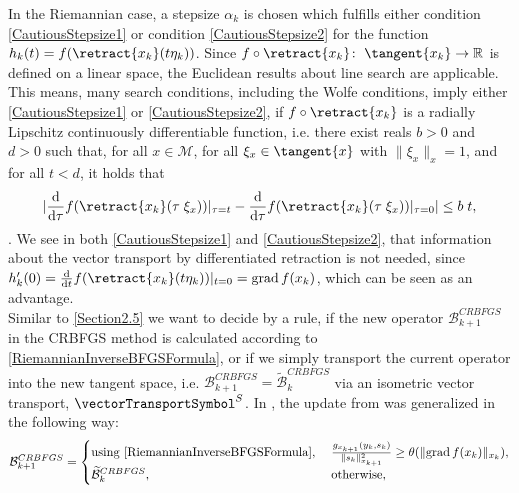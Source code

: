 In the Riemannian case, a stepsize $\alpha_k$ is chosen which fulfills either condition \cref{CautiousStepsize1} or condition \cref{CautiousStepsize2} for the function $h_k(t) = f(\retract{x_k}(t \eta_k))$. Since $f \circ \retract{x_k} \colon \; \tangent{x_k} \to \mathbb{R}$ is defined on a linear space, the Euclidean results about line search are applicable. This means, many search conditions, including the Wolfe conditions, imply either \cref{CautiousStepsize1} or \cref{CautiousStepsize2}, if $f \circ \retract{x_k}$ is a radially Lipschitz continuously differentiable function, i.e. there exist reals $b > 0$ and $d > 0$ such that, for all $x \in \mathcal{M}$, for all $\xi_x \in \tangent{x}$ with $\lVert \xi_x \rVert_x = 1$, and for all $t < d$, it holds that
\begin{equation}\label{RiemannianRadiallyLipschitzContinuouslyDifferentiable}
    \lvert \frac{\mathrm{d}}{\mathrm{d} \tau} f (\retract{x_k}(\tau \; \xi_x))\vert_{\tau = t} - \frac{\mathrm{d}}{\mathrm{d} \tau} f (\retract{x_k}(\tau \; \xi_x))\vert_{\tau = 0} \rvert \leq b \; t,
\end{equation}
\cite[p.~146]{AbsilMahonySepulchre:2008}. We see in both \cref{CautiousStepsize1} and \cref{CautiousStepsize2}, that information about the vector transport by differentiated retraction is not needed, since $h^{\prime}_k(0) = \frac{\mathrm{d}}{\mathrm{d} t} f(\retract{x_k}(t \eta_k))\vert_{t=0} = \operatorname{grad} f(x_k)$, which can be seen as an advantage. \\
Similar to \cref{Section2.5} we want to decide by a rule, if the new operator $\mathcal{B}^{CRBFGS}_{k+1}$ in the CRBFGS method is calculated according to \cref{RiemannianInverseBFGSFormula}, or if we simply transport the current operator into the new tangent space, i.e. $\mathcal{B}^{CRBFGS}_{k+1} = \widetilde{\mathcal{B}}^{CRBFGS}_k$ via an isometric vector transport, $\vectorTransportSymbol^{S}$. In \cite{HuangAbsilGallivan:2018}, the update from \cite{LiFukushima:2001} was generalized in the following way:
\begin{equation}\label{RiemannianCautiousUpdate}
    \mathcal{B}^{CRBFGS}_{k+1} = \begin{cases} \text{using \cref{RiemannianInverseBFGSFormula}}, & \; \frac{g_{x_{k+1}}(y_k,s_k)}{\lVert s_k \rVert^{2}_{x_{k+1}}} \geq \theta(\lVert \operatorname{grad} f(x_k) \rVert_{x_k}), \\ \widetilde{\mathcal{B}}^{CRBFGS}_k, & \; \text{otherwise}, \end{cases}
\end{equation}
